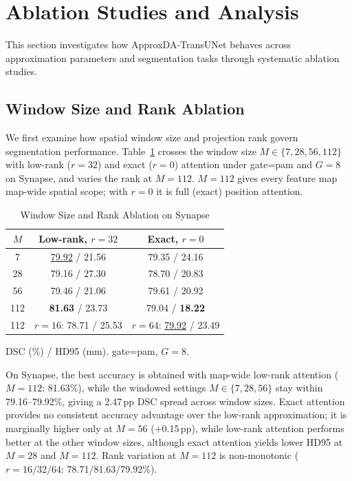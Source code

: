 \section{Ablation Studies and Analysis}
\label{sec:understanding}

This section investigates how ApproxDA-TransUNet behaves across approximation parameters and segmentation tasks through systematic ablation studies.

\subsection{Window Size and Rank Ablation}
\label{sec:approx_scale}

We first examine how spatial window size and projection rank govern segmentation performance. Table~\ref{tab:window_ablation} crosses the window size $M{\in}\{7,28,56,112\}$ with low-rank ($r{=}32$) and exact ($r{=}0$) attention under gate=pam and $G{=}8$ on Synapse, and varies the rank at $M{=}112$. $M{=}112$ gives every feature map map-wide spatial scope; with $r{=}0$ it is full (exact) position attention.

\begin{table}[ht]
  \caption{Window Size and Rank Ablation on Synapse}
  \label{tab:window_ablation}
  \centering
  \setlength{\tabcolsep}{4pt}
  \small
  \begin{tabular}{ccc}
    \toprule
    $M$ & Low-rank, $r{=}32$ & Exact, $r{=}0$ \\
    \midrule
    7   & \underline{79.92} / 21.56 & 79.35 / 24.16 \\
    28  & 79.16 / 27.30 & 78.70 / 20.83 \\
    56  & 79.46 / 21.06 & 79.61 / 20.92 \\
    112 & \textbf{81.63} / 23.73 & 79.04 / \textbf{18.22} \\
    \midrule
    112 & $r{=}16$: 78.71 / 25.53 & $r{=}64$: \underline{79.92} / 23.49 \\
    \bottomrule
  \end{tabular}\par\vspace{3pt}
  \begin{minipage}{\linewidth}\footnotesize DSC (\%) / HD95 (mm). gate=pam, $G{=}8$.\end{minipage}
\end{table}

On Synapse, the best accuracy is obtained with map-wide low-rank attention ($M{=}112$: 81.63\%), while the windowed settings $M{\in}\{7,28,56\}$ stay within 79.16--79.92\%, giving a 2.47\,pp DSC spread across window sizes. Exact attention provides no consistent accuracy advantage over the low-rank approximation; it is marginally higher only at $M{=}56$ ($+$0.15\,pp), while low-rank attention performs better at the other window sizes, although exact attention yields lower HD95 at $M{=}28$ and $M{=}112$. Rank variation at $M{=}112$ is non-monotonic ($r{=}16/32/64$: 78.71/81.63/79.92\%).

